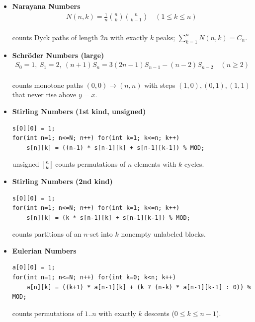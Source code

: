 \begin{itemize}
    \item \textbf{Narayana Numbers} \\
    \begin{equation*}
    \begin{aligned}
    N(n, k) = \frac{1}{n}\binom{n}{k}\binom{n}{k-1} \quad (1 \leq k \leq n)
    \end{aligned}
    \end{equation*} \\
    counts Dyck paths of length $2n$ with exactly $k$ peaks; $\sum_{k=1}^n N(n,k) = C_n$.

    \item \textbf{Schr\"oder Numbers (large)} \\
    \begin{equation*}
    \begin{aligned}
    S_0 = 1, \ S_1 = 2, \ (n+1)S_n = 3(2n-1)S_{n-1} - (n-2)S_{n-2} \quad (n \geq 2)
    \end{aligned}
    \end{equation*} \\
    counts monotone paths $(0,0) \to (n,n)$ with steps $(1,0), (0,1), (1,1)$ that never rise above $y=x$.

    \item \textbf{Stirling Numbers (1st kind, unsigned)}
\begin{verbatim}
s[0][0] = 1;
for(int n=1; n<=N; n++) for(int k=1; k<=n; k++)
    s[n][k] = ((n-1) * s[n-1][k] + s[n-1][k-1]) % MOD;
\end{verbatim}
    unsigned $\left[{n\atop k}\right]$ counts permutations of $n$ elements with $k$ cycles.

    \item \textbf{Stirling Numbers (2nd kind)}
\begin{verbatim}
s[0][0] = 1;
for(int n=1; n<=N; n++) for(int k=1; k<=n; k++)
    s[n][k] = (k * s[n-1][k] + s[n-1][k-1]) % MOD;
\end{verbatim}
    counts partitions of an $n$-set into $k$ nonempty unlabeled blocks.

    \item \textbf{Eulerian Numbers}
\begin{verbatim}
a[0][0] = 1;
for(int n=1; n<=N; n++) for(int k=0; k<n; k++)
    a[n][k] = ((k+1) * a[n-1][k] + (k ? (n-k) * a[n-1][k-1] : 0)) % MOD;
\end{verbatim}
    counts permutations of $1..n$ with exactly $k$ descents ($0 \leq k \leq n-1$).


\end{itemize}
